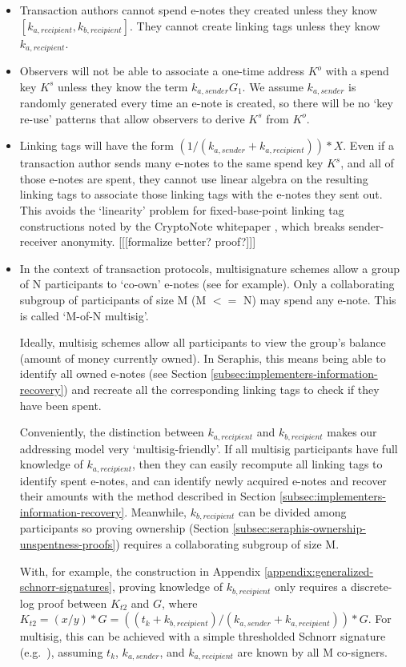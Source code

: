 \begin{itemize}
    \item Transaction authors cannot spend e-notes they created unless they know $[k_{a, recipient}, k_{b, recipient}]$. They cannot create linking tags unless they know $k_{a, recipient}$.

    \item Observers will not be able to associate a one-time address $K^o$ with a spend key $K^s$ unless they know the term $k_{a,sender} G_1$. We assume $k_{a,sender}$ is randomly generated every time an e-note is created, so there will be no `key re-use' patterns that allow observers to derive $K^s$ from $K^o$.

    \item Linking tags will have the form $(1/(k_{a, sender} + k_{a, recipient}))*X$. Even if a transaction author sends many e-notes to the same spend key $K^s$, and all of those e-notes are spent, they cannot use linear algebra on the resulting linking tags to associate those linking tags with the e-notes they sent out. This avoids the `linearity' problem for fixed-base-point linking tag constructions noted by the CryptoNote whitepaper \cite{cryptoNoteWhitePaper}, which breaks sender-receiver anonymity. [[[formalize better? proof?]]]

    \item In the context of transaction protocols, multisignature schemes allow a group of N participants to `co-own' e-notes (see \cite{MRL-0009-multisig} for example). Only a collaborating subgroup of participants of size M (M $<=$ N) may spend any e-note. This is called `M-of-N multisig'.

    Ideally, multisig schemes allow all participants to view the group's balance (amount of money currently owned). In Seraphis, this means being able to identify all owned e-notes (see Section \ref{subsec:implementers-information-recovery}) and recreate all the corresponding linking tags to check if they have been spent.

    Conveniently, the distinction between $k_{a, recipient}$ and $k_{b, recipient}$ makes our addressing model very `multisig-friendly'. If all multisig participants have full knowledge of $k_{a, recipient}$, then they can easily recompute all linking tags to identify spent e-notes, and can identify newly acquired e-notes and recover their amounts with the method described in Section \ref{subsec:implementers-information-recovery}. Meanwhile, $k_{b, recipient}$ can be divided among participants so proving ownership (Section \ref{subsec:seraphis-ownership-unspentness-proofs}) requires a collaborating subgroup of size M.

    With, for example, the construction in Appendix \ref{appendix:generalized-schnorr-signatures}, proving knowledge of $k_{b, recipient}$ only requires a discrete-log proof between $K_{t2}$ and $G$, where $K_{t2} = (x/y)*G = ((t_k + k_{b, recipient})/(k_{a, sender} + k_{a, recipient}))*G$. For multisig, this can be achieved with a simple thresholded Schnorr signature (e.g.\ \cite{...}), assuming $t_k$, $k_{a, sender}$, and $k_{a, recipient}$ are known by all M co-signers.
\end{itemize}



